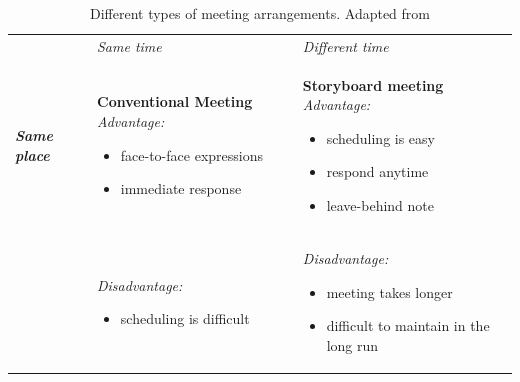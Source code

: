 \begin{table}[h]
\caption[Different types of meeting arrangements]{Different types of meeting arrangements. Adapted from \cite{jankowskiGISGroupDecision2001}}
\label{table:meeting_arrangements}
\begin{center}
\begin{tabular}{ L{3cm} L{5.5cm}  L{5.5cm}}  \hline
 & \textit{Same time} &\textit{Different time}  \\ 
\textbf{\textit{Same place}} & \textbf{Conventional Meeting} \qquad \textit{Advantage:} 
\vspace{-5mm}
\begin{itemize}
    \setlength{\itemsep}{0pt}%
    \setlength{\parskip}{0pt}%
	\item{face-to-face expressions}
	\item{immediate response}
\end{itemize} &
\textbf{Storyboard meeting} \qquad \textit{Advantage:} 
\vspace{-5mm}
\begin{itemize}
    \setlength{\itemsep}{0pt}%
    \setlength{\parskip}{0pt}%
	\item{scheduling is easy}
	\item{respond anytime}
	\item{leave-behind note}
\end{itemize} 
\\
& \textit{Disadvantage:} 
\vspace{-5mm}
\begin{itemize}
    \setlength{\itemsep}{0pt}%
    \setlength{\parskip}{0pt}%
	\item{scheduling is difficult}
\end{itemize} &
\textit{Disadvantage:} 
\vspace{-5mm}
\begin{itemize}
    \setlength{\itemsep}{0pt}%
    \setlength{\parskip}{0pt}%
	\item{meeting takes longer}
	\item{difficult to maintain in the long run}
\end{itemize} 
\\ \hline


\end{tabular}
\end{center}
\end{table}
